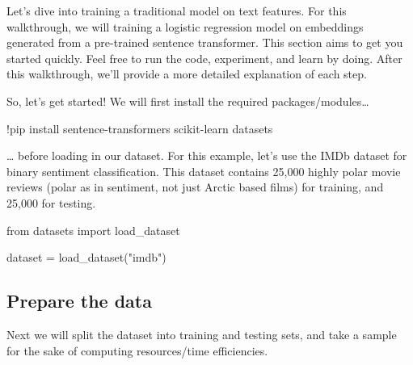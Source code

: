 \documentclass[
  letterpaper,
  DIV=11,
  numbers=noendperiod]{scrreprt}
\newenvironment{Shaded}{\begin{snugshade}}{\end{snugshade}}
\newcommand{\ImportTok}[1]{\textcolor[rgb]{0.00,0.46,0.62}{#1}}
\newcommand{\NormalTok}[1]{\textcolor[rgb]{0.00,0.23,0.31}{#1}}
\newcommand{\OperatorTok}[1]{\textcolor[rgb]{0.37,0.37,0.37}{#1}}
\newcommand{\StringTok}[1]{\textcolor[rgb]{0.13,0.47,0.30}{#1}}
\begin{document}
Let's dive into training a traditional model on text features. For this
walkthrough, we will training a logistic regression model on embeddings
generated from a pre-trained sentence transformer. This section aims to
get you started quickly. Feel free to run the code, experiment, and
learn by doing. After this walkthrough, we'll provide a more detailed
explanation of each step.

So, let's get started! We will first install the required
packages/modules\ldots{}

\begin{Shaded}
\begin{Highlighting}[]
\OperatorTok{!}\NormalTok{pip install sentence}\OperatorTok{{-}}\NormalTok{transformers scikit}\OperatorTok{{-}}\NormalTok{learn datasets}
\end{Highlighting}
\end{Shaded}

\ldots{} before loading in our dataset. For this example, let's use the
IMDb dataset for binary sentiment classification. This dataset contains
25,000 highly polar movie reviews (polar as in sentiment, not just
Arctic based films) for training, and 25,000 for testing.

\begin{Shaded}
\begin{Highlighting}[]
\ImportTok{from}\NormalTok{ datasets }\ImportTok{import}\NormalTok{ load\_dataset}

\NormalTok{dataset }\OperatorTok{=}\NormalTok{ load\_dataset(}\StringTok{"imdb"}\NormalTok{)}
\end{Highlighting}
\end{Shaded}

\subsection{Prepare the data}\label{prepare-the-data}

Next we will split the dataset into training and testing sets, and take
a sample for the sake of computing resources/time efficiencies.
\end{document}
